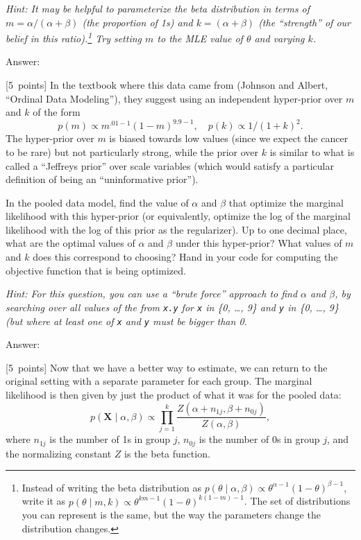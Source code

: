 \documentclass{article}
\newcommand{\ask}[1]{\textcolor{question}{#1}}
\newenvironment{answer}{\par\begingroup\color{answer}Answer: }{\endgroup}
\newcommand{\pts}[1]{\textcolor{points}{[#1~points]}}
\newcommand{\hint}[1]{\textcolor{black!60!white}{\emph{Hint: #1}}}
\newcommand{\TODO}{\color{red}{TODO}}
\newcommand{\bX}{\mathbf{X}}
\begin{document}
\begin{qlist}
\hint{%
    It may be helpful to parameterize the beta distribution in terms of
    $m=\alpha/(\alpha+\beta)$ (the proportion of 1s)
    and $k = (\alpha+\beta)$ (the ``strength'' of our belief in this ratio).\footnote{%
        Instead of writing the beta distribution as
        $p(\theta \; | \; \alpha, \beta) \propto \theta^{\alpha-1}(1-\theta)^{\beta-1}$,
        write it as $p(\theta \; | \; m, k) \propto \theta^{km-1}(1-\theta)^{k(1-m)-1}$.
        The set of distributions you can represent is the same,
        but the way the parameters change the distribution changes.}
    Try setting $m$ to the MLE value of $\theta$ and varying $k$.}

\begin{answer}\TODO\end{answer}


\item \pts{5}
    In the textbook where this data came from (Johnson and Albert, ``Ordinal Data Modeling''),
    they suggest using an independent hyper-prior over $m$ and $k$ of the form
    \[ p(m) \propto m^{.01-1}(1-m)^{9.9-1}, \quad p(k) \propto 1/(1+k)^2  .\]
    The hyper-prior over $m$ is biased towards low values (since we expect the cancer to be rare) but not particularly strong,
    while the prior over $k$ is similar to what is called a ``Jeffreys prior'' over scale variables 
    (which would satisfy a particular definition of being an ``uninformative prior'').

    In the pooled data model,
    find the value of $\alpha$ and $\beta$ that optimize the marginal likelihood with this hyper-prior
    (or equivalently, optimize the log of the marginal likelihood with the log of this prior as the regularizer).
    \ask{Up to one decimal place, what are the optimal values of $\alpha$ and $\beta$ under this hyper-prior?
         What values of $m$ and $k$ does this correspond to choosing?
         Hand in your code for computing the objective function that is being optimized.}

    \hint{For this question, you can use a ``brute force'' approach to find $\alpha$ and $\beta$, by searching over all values of the from \texttt{x.y} for \texttt{x} in \{0, \dots, 9\} and \texttt{y} in \{0, \dots, 9\} (but where at least one of \texttt{x} and \texttt{y} must be bigger than 0.}

\begin{answer}\TODO\end{answer}


\item \label{q:eb:newprior-sep} \pts{5}
    Now that we have a better way to estimate,
    we can return to the original setting with a separate parameter for each group.
    The marginal likelihood is then given by just the product of what it was for the pooled data:
    \[
        p(\bX \mid \alpha, \beta) \propto
        \prod_{j=1}^k \frac{Z(\alpha+n_{1j},\beta + n_{0j})}{Z(\alpha,\beta)}
    ,\]
    where $n_{1j}$ is the number of 1s in group $j$,
    $n_{0j}$ is the number of 0s in group $j$,
    and the normalizing constant $Z$ is the beta function.


\end{qlist}
\end{document}
